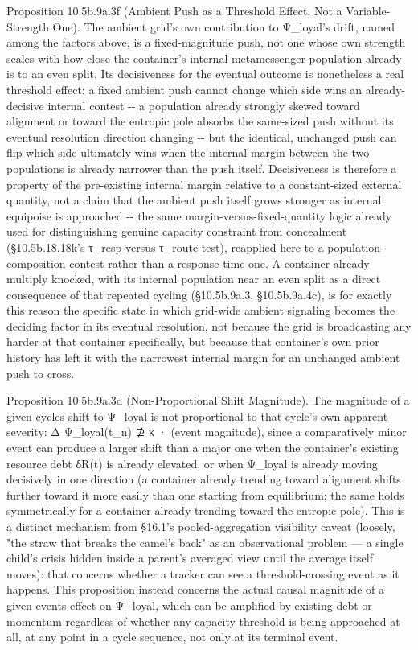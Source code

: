 \documentclass[
]{article}
\begin{document}
Proposition 10.5b.9a.3f (Ambient Push as a Threshold Effect, Not a
Variable-Strength One). The ambient grid's own contribution to
Ψ\_loyal's drift, named among the factors above, is a fixed-magnitude
push, not one whose own strength scales with how close the container's
internal metamessenger population already is to an even split. Its
decisiveness for the eventual outcome is nonetheless a real threshold
effect: a fixed ambient push cannot change which side wins an
already-decisive internal contest -\/- a population already strongly
skewed toward alignment or toward the entropic pole absorbs the
same-sized push without its eventual resolution direction changing -\/-
but the identical, unchanged push can flip which side ultimately wins
when the internal margin between the two populations is already narrower
than the push itself. Decisiveness is therefore a property of the
pre-existing internal margin relative to a constant-sized external
quantity, not a claim that the ambient push itself grows stronger as
internal equipoise is approached -\/- the same
margin-versus-fixed-quantity logic already used for distinguishing
genuine capacity constraint from concealment (§10.5b.18.18k's
τ\_resp-versus-τ\_route test), reapplied here to a
population-composition contest rather than a response-time one. A
container already multiply knocked, with its internal population near an
even split as a direct consequence of that repeated cycling
(§10.5b.9a.3, §10.5b.9a.4c), is for exactly this reason the specific
state in which grid-wide ambient signaling becomes the deciding factor
in its eventual resolution, not because the grid is broadcasting any
harder at that container specifically, but because that container's own
prior history has left it with the narrowest internal margin for an
unchanged ambient push to cross.

Proposition 10.5b.9a.3d (Non-Proportional Shift Magnitude). The
magnitude of a given cycles shift to Ψ\_loyal is not proportional to
that cycle's own apparent severity: Δ Ψ\_loyal(t\_n) ⊉ κ · (event
magnitude), since a comparatively minor event can produce a larger shift
than a major one when the container's existing resource debt δR(t) is
already elevated, or when Ψ\_loyal is already moving decisively in one
direction (a container already trending toward alignment shifts further
toward it more easily than one starting from equilibrium; the same holds
symmetrically for a container already trending toward the entropic
pole). This is a distinct mechanism from §16.1's pooled-aggregation
visibility caveat (loosely, "the straw that breaks the camel's back" as
an observational problem --- a single child's crisis hidden inside a
parent's averaged view until the average itself moves): that concerns
whether a tracker can see a threshold-crossing event as it happens. This
proposition instead concerns the actual causal magnitude of a given
events effect on Ψ\_loyal, which can be amplified by existing debt or
momentum regardless of whether any capacity threshold is being
approached at all, at any point in a cycle sequence, not only at its
terminal event.
\end{document}
